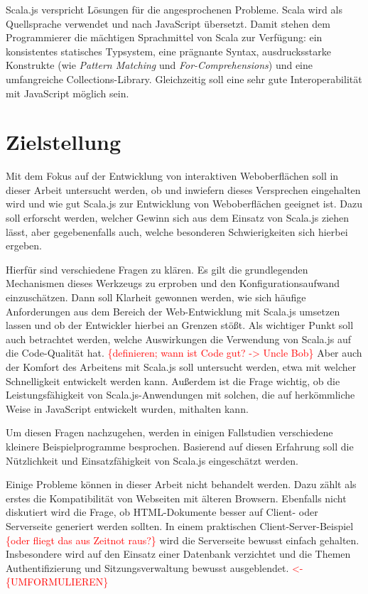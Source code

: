 \documentclass[a4paper, 12pt, hidelinks, listof=totoc, listoftables=totoc, bibliography=totoc]{scrreprt}
\newcommand{\TODOi}[1]{\textcolor{red}{\{#1\}}}
\newcommand{\REDOi}{\textcolor{red}{<- \{UMFORMULIEREN\}~}}
\begin{document}
Scala.js verspricht Lösungen für die angesprochenen Probleme. Scala wird als Quellsprache verwendet und nach JavaScript übersetzt. Damit stehen dem Programmierer die mächtigen Sprachmittel von Scala zur Verfügung: ein konsistentes statisches Typsystem, eine prägnante Syntax, ausdrucksstarke Konstrukte (wie \emph{Pattern Matching} und \emph{For-Comprehensions}) und eine umfangreiche Collections-Library. Gleichzeitig soll eine sehr gute Interoperabilität mit JavaScript möglich sein.


\section{Zielstellung}

Mit dem Fokus auf der Entwicklung von interaktiven Weboberflächen soll in dieser Arbeit untersucht werden, ob und inwiefern dieses Versprechen eingehalten wird und wie gut Scala.js zur Entwicklung von Weboberflächen geeignet ist. Dazu soll erforscht werden, welcher Gewinn sich aus dem Einsatz von Scala.js ziehen lässt, aber gegebenenfalls auch, welche besonderen Schwierigkeiten sich hierbei ergeben.

Hierfür sind verschiedene Fragen zu klären. Es gilt die grundlegenden Mechanismen dieses Werkzeugs zu erproben und den Konfigurationsaufwand einzuschätzen. Dann soll Klarheit gewonnen werden, wie sich häufige Anforderungen aus dem Bereich der Web-Entwicklung mit Scala.js umsetzen lassen und ob der Entwickler hierbei an Grenzen stößt. Als wichtiger Punkt soll auch betrachtet werden, welche Auswirkungen die Verwendung von Scala.js auf die Code-Qualität hat. \TODOi{definieren; wann ist Code gut? -> Uncle Bob} Aber auch der Komfort des Arbeitens mit Scala.js soll untersucht werden, etwa mit welcher Schnelligkeit entwickelt werden kann. Außerdem ist die Frage wichtig, ob die Leistungsfähigkeit von Scala.js-Anwendungen mit solchen, die auf herkömmliche Weise in JavaScript entwickelt wurden, mithalten kann.

Um diesen Fragen nachzugehen, werden in einigen Fallstudien verschiedene kleinere Beispielprogramme besprochen. Basierend auf diesen Erfahrung soll die Nützlichkeit und Einsatzfähigkeit von Scala.js eingeschätzt werden.

Einige Probleme können in dieser Arbeit nicht behandelt werden. Dazu zählt als erstes die Kompatibilität von Webseiten mit älteren Browsern. Ebenfalls nicht diskutiert wird die Frage, ob HTML-Dokumente besser auf Client- oder Serverseite generiert werden sollten. In einem praktischen Client-Server-Beispiel \TODOi{oder fliegt das aus Zeitnot raus?} wird die Serverseite bewusst einfach gehalten. Insbesondere wird auf den Einsatz einer Datenbank verzichtet und die Themen Authentifizierung und Sitzungsverwaltung bewusst ausgeblendet. \REDOi
\end{document}

